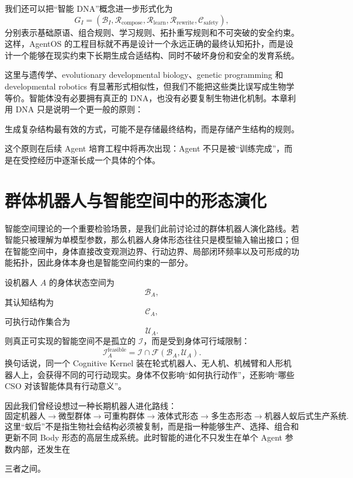 我们还可以把“智能 DNA”概念进一步形式化为
\[
G_I
=
\left(
\mathcal B_I,
\mathcal R_{\mathrm{compose}},
\mathcal R_{\mathrm{learn}},
\mathcal R_{\mathrm{rewrite}},
\mathcal C_{\mathrm{safety}}
\right),
\]
分别表示基础原语、组合规则、学习规则、拓扑重写规则和不可突破的安全约束。这样，AgentOS 的工程目标就不再是设计一个永远正确的最终认知拓扑，而是设计一个能够在现实约束下长期生成合适结构、同时不破坏身份和安全的发育系统。

这里与遗传学、evolutionary developmental biology、genetic programming 和 developmental robotics 有显著形式相似性，但我们不能把这些类比误写成生物学等价。智能体没有必要拥有真正的 DNA，也没有必要复制生物进化机制。本章利用 DNA 只是说明一个更一般的原则：

\begin{proposition*}
生成复杂结构最有效的方式，可能不是存储最终结构，而是存储产生结构的规则。
\end{proposition*}

这个原则在后续 Agent 培育工程中将再次出现：Agent 不只是被“训练完成”，而是在受控经历中逐渐长成一个具体的个体。

\section{群体机器人与智能空间中的形态演化}

智能空间理论的一个重要检验场景，是我们此前讨论过的群体机器人演化路线。若智能只被理解为单模型参数，那么机器人身体形态往往只是模型输入输出接口；但在智能空间中，身体直接改变观测边界、行动边界、局部闭环频率以及可形成的功能拓扑，因此身体本身也是智能空间约束的一部分。

设机器人 $A$ 的身体状态空间为
\[
\mathcal B_A,
\]
其认知结构为
\[
\mathcal C_A,
\]
可执行动作集合为
\[
\mathcal U_A.
\]
则真正可实现的智能空间不是孤立的 $\mathscr I$，而是受到身体可行域限制：
\[
\boxed{
\mathscr I_A^{\mathrm{feasible}}
=
\mathscr I
\cap
\mathcal F(\mathcal B_A,\mathcal U_A).
}
\]
换句话说，同一个 Cognitive Kernel 装在轮式机器人、无人机、机械臂和人形机器人上，会获得不同的可行动现实。身体不仅影响“如何执行动作”，还影响“哪些 CSO 对该智能体具有行动意义”。

因此我们曾经设想过一种长期机器人进化路线：
\[
\text{固定机器人}
\rightarrow
\text{微型群体}
\rightarrow
\text{可重构群体}
\rightarrow
\text{液体式形态}
\rightarrow
\text{多生态形态}
\rightarrow
\text{机器人蚁后式生产系统}.
\]
这里“蚁后”不是指生物社会结构必须被复制，而是指一种能够生产、选择、组合和更新不同 Body 形态的高层生成系统。此时智能的进化不只发生在单个 Agent 参数内部，还发生在
\begin{statementbox}
\centering
{}
\end{statementbox}
三者之间。

